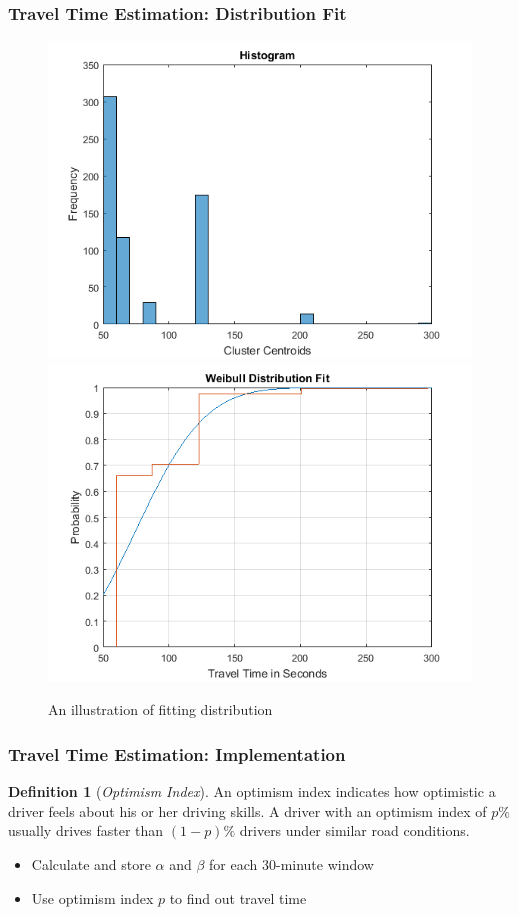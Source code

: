 \documentclass{beamer}
\theoremstyle{definition}
\newtheorem{defn}{Definition}
\begin{document}
\begin{frame}
\frametitle{Travel Time Estimation: Distribution Fit}
\begin{figure}[h!]
\centering
\includegraphics[scale = 0.4]{clus_histo}
\includegraphics[scale = 0.4]{weibull_fit}
\caption{An illustration of fitting distribution} 
\end{figure}
\end{frame}

\begin{frame}
\frametitle{Travel Time Estimation: Implementation}
\begin{defn}[\emph{Optimism Index}]\label{Def:opti_index}
An optimism index indicates how optimistic a driver feels about his or her driving skills. A driver with an optimism index of $p\%$ usually drives faster than $(1 - p)\%$ drivers under similar road conditions.
\end{defn}
\begin{itemize}
	\item <1-> Calculate and store $\alpha$ and $\beta$ for each 30-minute window
	\item <2-> Use optimism index $p$ to find out travel time
\end{itemize}
\end{frame}
\end{document}
